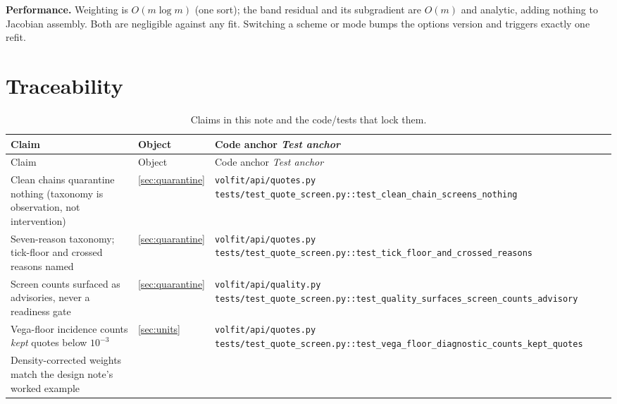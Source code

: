 \documentclass[11pt]{article}
\begin{document}
\noindent\textbf{Performance.}  Weighting is $O(m\log m)$ (one sort); the
band residual and its subgradient are $O(m)$ and analytic, adding nothing
to Jacobian assembly.  Both are negligible against any fit.  Switching a
scheme or mode bumps the options version and triggers exactly one refit.

\section{Traceability}
\label{app:trace}

\begingroup
\small
\setlength{\tabcolsep}{4pt}
\renewcommand{\arraystretch}{1.15}
\begin{longtable}{@{}p{}p{}p{}@{}}
\caption{Claims in this note and the code/tests that lock them.}\label{tab:trace}\\
\toprule Claim & Object & Code anchor \newline \emph{Test anchor}\\ \midrule
\endfirsthead
\toprule Claim & Object & Code anchor \newline \emph{Test anchor}\\ \midrule
\endhead
Clean chains quarantine nothing (taxonomy is observation, not
intervention) &
\cref{sec:quarantine} &
\nolinkurl{volfit/api/quotes.py}\newline
\nolinkurl{tests/test_quote_screen.py::test_clean_chain_screens_nothing}\\
\addlinespace
Seven-reason taxonomy; tick-floor and crossed reasons named &
\cref{sec:quarantine} &
\nolinkurl{volfit/api/quotes.py}\newline
\nolinkurl{tests/test_quote_screen.py::test_tick_floor_and_crossed_reasons}\\
\addlinespace
Screen counts surfaced as advisories, never a readiness gate &
\cref{sec:quarantine} &
\nolinkurl{volfit/api/quality.py}\newline
\nolinkurl{tests/test_quote_screen.py::test_quality_surfaces_screen_counts_advisory}\\
\addlinespace
Vega-floor incidence counts \emph{kept} quotes below $10^{-3}$ &
\cref{sec:units} &
\nolinkurl{volfit/api/quotes.py}\newline
\nolinkurl{tests/test_quote_screen.py::test_vega_floor_diagnostic_counts_kept_quotes}\\
\addlinespace
Density-corrected weights match the design note's worked example &

\end{longtable}
\end{document}
